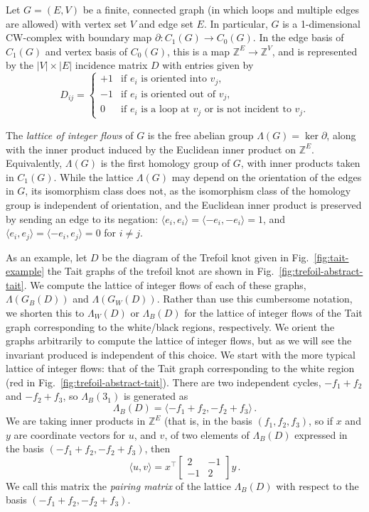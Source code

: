 \documentclass[12pt]{report}
\newcommand{\Z}{\mathbb{Z}}
\newcommand{\ip}[2]{\langle #1, #2 \rangle}
\begin{document}
Let $G = (E, V)$ be a finite, connected graph (in which loops and multiple edges are allowed) with vertex set $V$ and edge set $E$. In particular, $G$ is a 1-dimensional CW-complex with boundary map $\partial: C_{1}(G) \longrightarrow C_{0}(G)$. In the edge basis of $C_{1}(G)$ and vertex basis of $C_{0}(G)$, this is a map $\Z^{E} \longrightarrow \Z^{V}$, and is represented by the $|V|\times|E|$ incidence matrix $D$ with entries given by
\[D_{ij} = \begin{cases}
	+1 & \text{if $e_{i}$ is oriented into $v_{j}$,}   \\
	-1 & \text{if $e_{i}$ is oriented out of $v_{j}$,} \\
	0  & \text{if $e_{i}$ is a loop at $v_{j}$ or is not incident to $v_{j}$.}
\end{cases}\]

The \textit{lattice of integer flows} of $G$ is the free abelian group $\Lambda(G) = \ker \partial$, along with the inner product induced by the Euclidean inner product on $\Z^{E}$. Equivalently, $\Lambda(G)$ is the first homology group of $G$, with inner products taken in $C_{1}(G)$. While the lattice $\Lambda(G)$ may depend on the orientation of the edges in $G$, its isomorphism class does not, as the isomorphism class of the homology group is independent of orientation, and the Euclidean inner product is preserved by sending an edge to its negation: $\ip{e_{i}}{e_{i}} =  \ip{-e_{i}}{-e_{i}} = 1$, and $\ip{e_{i}}{e_{j}} = \ip{-e_{i}}{e_{j}} = 0$ for $i \neq j$.

As an example, let $D$ be the diagram of the Trefoil knot given in Fig.~\ref{fig:tait-example} the Tait graphs of the trefoil knot   are shown in Fig.~\ref{fig:trefoil-abstract-tait}. We compute the lattice of integer flows of each of these graphs, $\Lambda(G_{B}(D))$ and $\Lambda(G_W(D))$. Rather than use this cumbersome notation, we shorten this to $\Lambda_{W}(D)$ or $\Lambda_{B}(D)$ for the lattice of integer flows of the Tait graph corresponding to the white/black regions, respectively. We orient the graphs arbitrarily to compute the lattice of integer flows, but as we will see the invariant produced is independent of this choice. We start with the more typical lattice of integer flows: that of the Tait graph corresponding to the white region (red in Fig.~\ref{fig:trefoil-abstract-tait}). There are two independent cycles, $-f_{1} + f_{2}$ and $-f_{2} + f_{3}$, so $\Lambda_{B}(3_{1})$ is generated as
\[\Lambda_{B}(D) = \langle -f_{1} + f_{2}, -f_{2} + f_{3} \rangle\,.\]
We are taking inner products in $\Z^{E}$ (that is, in the basis {$(f_{1}, f_{2}, f_{3})$}, so if $x$ and $y$ are coordinate vectors for $u$, and $v$, of two elements of $\Lambda_{B}(D)$ expressed in the basis $(-f_{1} + f_{2}, -f_{2} + f_{3})$, then
\[\langle u, v \rangle = x^{\top}\begin{bmatrix}
	2  & -1 \\
	-1 & 2
\end{bmatrix}y\,.\]
We call this matrix the \textit{pairing matrix} of the lattice $\Lambda_{B}(D)$ with respect to the basis ${(-f_{1} + f_{2}, -f_{2} + f_{3})}$.
\end{document}
